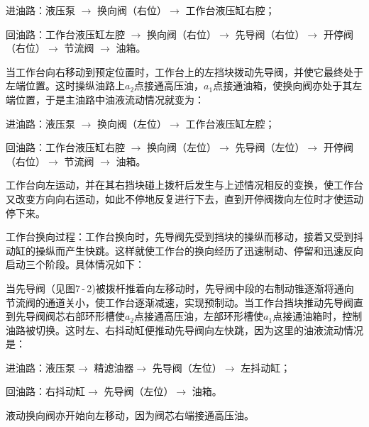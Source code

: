 进油路：液压泵 $\rightarrow$ 换向阀（右位）$\rightarrow$ 工作台液压缸右腔；

回油路：工作台液压缸左腔 $\rightarrow$ 换向阀（右位）$\rightarrow$ 先导阀（右位）$\rightarrow$ 开停阀（右位）$\rightarrow$ 节流阀 $\rightarrow$ 油箱。

当工作台向右移动到预定位置时，工作台上的左挡块拨动先导阀，并使它最终处于左端位置。这时操纵油路上$a_{2}$点接通高压油，$a_{1}$点接通油箱，使换向阀亦处于其左端位置，于是主油路中油液流动情况就变为：

进油路：液压泵 $\rightarrow$ 换向阀（左位）$\rightarrow$ 工作台液压缸左腔；

回油路：工作台液压缸右腔 $\rightarrow$ 换向阀（左位）$\rightarrow$ 先导阀（左位）$\rightarrow$ 开停阀（右位）$\rightarrow$ 节流阀 $\rightarrow$ 油箱。

工作台向左运动，并在其右挡块碰上拨杆后发生与上述情况相反的变换，使工作台又改变方向向右运动，如此不停地反复进行下去，直到开停阀拨向左位时才使运动停下来。

工作台换向过程：工作台换向时，先导阀先受到挡块的操纵而移动，接着又受到抖动缸的操纵而产生快跳。这样就使工作台的换向经历了迅速制动、停留和迅速反向启动三个阶段。具体情况如下：

当先导阀（见图7\,-\,2)被拨杆推着向左移动时，先导阀中段的右制动锥逐渐将通向节流阀的通道关小，使工作台逐渐减速，实现预制动。当工作台挡块推动先导阀直到先导阀阀芯右部环形槽使$a_{2}$点接通高压油，左部环形槽使$a_{1}$点接通油箱时，控制油路被切换。这时左、右抖动缸便推动先导阀向左快跳，因为这里的油液流动情况是：

进油路：液压泵$\rightarrow$ 精滤油器$\rightarrow$ 先导阀（左位）$\rightarrow$ 左抖动缸；

回油路：右抖动缸$\rightarrow$ 先导阀（左位）$\rightarrow$ 油箱。

液动换向阀亦开始向左移动，因为阀芯右端接通高压油。